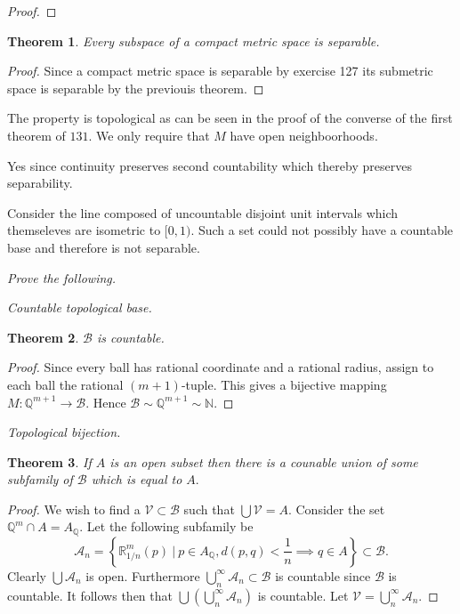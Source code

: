 \documentclass[letter]{article}
\newtheorem{theorem}{Theorem}
\newenvironment{menumerate}{%
  \edef\backupindent{\the\parindent}%
  \enumerate%
  \setlength{\parindent}{\backupindent}%
}{\endenumerate}
\begin{document}
\begin{menumerate}
\begin{menumerate}
\begin{proof}
			\end{proof}
			\begin{theorem}
			    Every subspace of a compact metric space is separable.
			\end{theorem}
			\begin{proof}
				Since a compact metric space is separable by exercise 127 its submetric space is separable by the previouis theorem.
			\end{proof}
			\item The property is topological as can be seen in the proof of the converse of the first theorem of $131.$ We only require that $M$ have open neighboorhoods.
			\item Yes since continuity preserves second countability which thereby preserves separability. 
		\end{menumerate}

	\item Consider the line composed of uncountable disjoint unit intervals which themseleves are isometric to $[0,1).$ Such a set could not possibly have a countable base and therefore is not separable.
	\item \emph{Prove the following.}
		\begin{menumerate}
			\item \emph{Countable topological base.}
			\begin{theorem}
				$\mathcal{B}$ is countable.
			\end{theorem}
			\begin{proof}
				Since every ball has rational coordinate and a rational radius, assign to each ball the rational $(m+1)$-tuple. This gives a bijective mapping $M:\mathbb{Q}^{m+1} \to \mathcal{B}.$ Hence $\mathcal{B} \sim \mathbb{Q}^{m+1} \sim \mathbb{N}.$
			\end{proof}
			\item \emph{Topological bijection.}
			\begin{theorem}
				If $A$ is an open subset then there is a counable union of some subfamily of $\mathcal{B}$ which is equal to $A.$
			\end{theorem}
			\begin{proof}
				We wish to find a $\mathcal{V} \subset \mathcal{B}$ such that $\bigcup \mathcal{V} = A.$ Consider the set $\mathbb{Q}^m \cap A = A_\mathbb{Q}. $ Let the following subfamily be  $$\mathcal{A}_n = \left\{\mathbb{R}_{1/n}^m(p)\ \Big|\ p \in A_\mathbb{Q}, d(p,q) < \frac{1}{n} \implies q \in A\right\} \subset \mathcal{B}.$$
				Clearly $\bigcup \mathcal{A}_n$ is open. Furthermore $\bigcup_n^\infty \mathcal{A}_n \subset \mathcal{B}$ is countable since $\mathcal{B}$ is countable. It follows then that $\bigcup \left( \bigcup_n^\infty \mathcal{A}_n\right)$ is countable. Let $\mathcal{V} = \bigcup_n^\infty \mathcal{A}_n.$


\end{proof}
\end{menumerate}
\end{menumerate}
\end{document}
